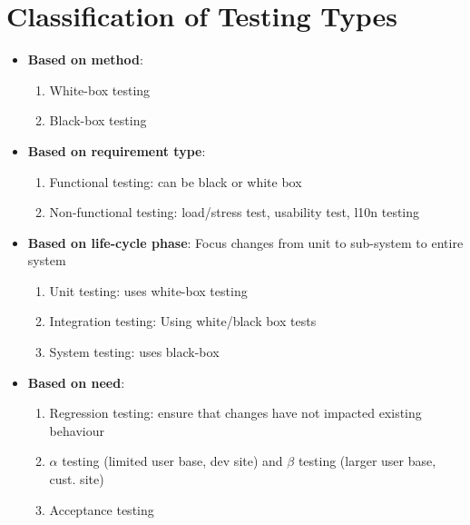 \documentclass{article}
\begin{document}
\section{Classification of Testing Types}
\begin{itemize}
    \item\textbf{Based on method}:
    \begin{enumerate}
        \item White-box testing
        
        \item Black-box testing
    \end{enumerate}
    
    \item \textbf{Based on requirement type}:
    \begin{enumerate}
        \item Functional testing: can be black or white box
        
        \item Non-functional testing: load/stress test, usability test, l10n testing
    \end{enumerate}
    
    \item \textbf{Based on life-cycle phase}: Focus changes from unit to sub-system to entire system
    \begin{enumerate}
        \item Unit testing: uses white-box testing
        \item Integration testing: Using white/black box tests
        \item System testing: uses black-box
    \end{enumerate}
    
    \item \textbf{Based on need}:
    \begin{enumerate}
        \item Regression testing: ensure that changes have not impacted existing behaviour
        
        \item $\alpha$ testing (limited user base, dev site) and $\beta$ testing (larger user base, cust. site)
        \item Acceptance testing
    \end{enumerate}
\end{itemize}
\end{document}

